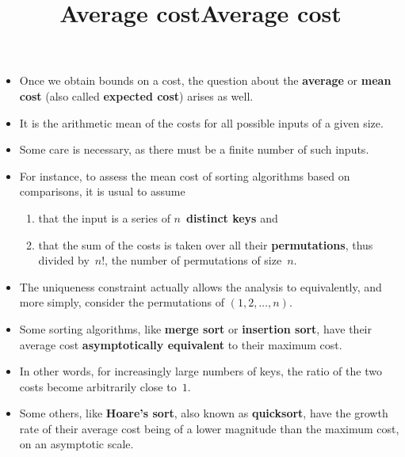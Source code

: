 \documentclass[wide]{slides}
\begin{document}
\begin{slide}
  \title{Average cost}

  \begin{itemize}

    \item Once we obtain bounds on a cost, the question about the
      \textbf{average} or \textbf{mean cost} (also called
      \textbf{expected cost}) arises as well.

    \item It is the arithmetic mean of the costs for all possible
      inputs of a given size.

    \item Some care is necessary, as there must be a finite number of
      such inputs.

    \item For instance, to assess the mean cost of sorting algorithms
      based on comparisons, it is usual to assume
      \begin{enumerate}

        \item that the input is a series of \(n\)~\textbf{distinct
          keys} and

        \item that the sum of the costs is taken over all their
          \textbf{permutations}, thus divided by~\(n!\), the number of
          permutations of size~\(n\).

      \end{enumerate}

  \end{itemize}

\end{slide}

\begin{slide}
  \title{Average cost}

  \begin{itemize}

    \item The uniqueness constraint actually allows the analysis to
      equivalently, and more simply, consider the permutations of
      \((1,2,\dots,n)\).

    \item Some sorting algorithms, like \textbf{merge sort} or
      \textbf{insertion sort}, have their average cost
      \textbf{asymptotically equivalent} to their maximum cost.

    \item In other words, for increasingly large numbers of keys, the
      ratio of the two costs become arbitrarily close to~\(1\).

    \item Some others, like \textbf{Hoare's sort}, also known as
      \textbf{quicksort}, have the growth rate of their average cost
      being of a lower magnitude than the maximum cost, on an
      asymptotic scale.

  \end{itemize}

\end{slide}
\end{document}

